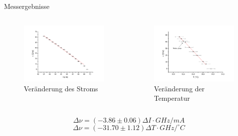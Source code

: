 \documentclass{beamer}
\begin{document}
\begin{frame}{Messergebnisse}
\begin{columns}
\begin{column}{5cm}
	\begin{figure}[H]
	\centering \includegraphics[width=1\textwidth]{Bilder/T_fest.pdf}
	\caption{Veränderung des Stroms}
	\end{figure}
\end{column}
\begin{column}{5cm}
	\begin{figure}[H]
	\centering \includegraphics[width=1\textwidth]{Bilder/I_fest.pdf}
	\caption{Veränderung der Temperatur}
	\end{figure}
\end{column}
\end{columns}
$$\Delta\nu = (-3.86 \pm 0.06)\Delta I\cdot GHz/mA$$
$$\Delta\nu = (-31.70 \pm 1.12)\Delta T\cdot GHz/^\circ C$$
\end{frame}
\end{document}
